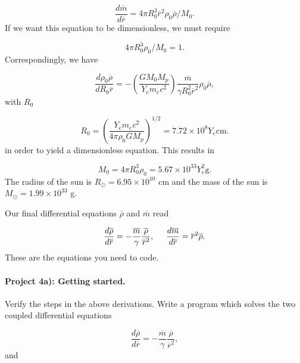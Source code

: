 \documentclass[%
oneside,                 %
final,                   %
10pt]{article}
\begin{document}
\begin{equation*}
\frac{d\overline{m}}{d\overline{r}}=
4\pi R_0^3\overline{r}^{2}\rho_0\overline{\rho}/M_0.
\end{equation*}
If we want this equation to be dimensionless, we must require

\begin{equation*}
4\pi R_{0}^{3}\rho_{0}/M_0=1.
\end{equation*}
Correspondingly, we have

\begin{equation*}
\frac{d\rho_0\overline{\rho}}{dR_0\overline{r}}=
-\left(\frac{GM_0M_p}{Y_em_ec^2 }\right)\frac{\overline{m}}
{\gamma R_0^2\overline{r}^{2}}
\rho_0\overline{\rho},
\end{equation*}
with $R_0$

\begin{equation*}
R_{0}=\left(\frac{Y_{e}m_{e}c^2}{4\pi\rho_{0} GM_{p}}\right)^{1/2}
=7.72\times 10^{8} Y_{e} \mathrm{cm}.
\end{equation*}
in order to yield a dimensionless equation. This results in

\begin{equation*}
M_{0}=4\pi R_{0}^{3}\rho_{0}=5.67 \times 10^{33}Y_{e}^{2} \mathrm{g}.
\end{equation*}
The radius of the sun is $R_{\odot}=6.95\times 10^{10}$ cm 
and the mass of the sun is 
$M_{\odot}=1.99\times 10^{33}$ g.

Our final differential equations 
$\overline{\rho}$ and
$\overline{m}$ read

\begin{equation*}
\frac{d\overline{\rho}}{d\overline{r}}=-\frac{\overline{m}}{\gamma}\frac{\overline{\rho}}
{\overline{r}^{2}},
\hspace{5mm}\frac{d\overline{m}}{d\overline{r}}=
\overline{r}^{2}\overline{\rho}.
\end{equation*}
These are the equations you need to code.


\paragraph{Project 4a): Getting started.}
Verify the steps in the above derivations. Write a program which solves the two coupled
differential equations

\begin{equation*}
\frac{d\overline{\rho}}{d\overline{r}}=-\frac{\overline{m}}{\gamma}\frac{\overline{\rho}}
{\overline{r}^{2}},
\end{equation*}
and
\end{document}
